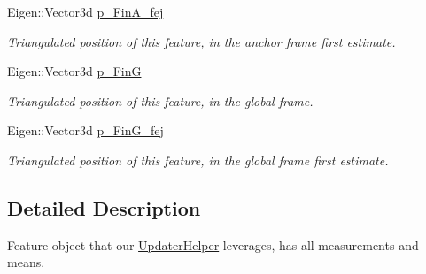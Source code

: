 \begin{DoxyCompactItemize}
\mbox{\label{structov__msckf_1_1UpdaterHelper_1_1UpdaterHelperFeature_a0558ee91d9c7e0929a10b5b4f4946f02}} 
Eigen\+::\+Vector3d \hyperlink{structov__msckf_1_1UpdaterHelper_1_1UpdaterHelperFeature_a0558ee91d9c7e0929a10b5b4f4946f02}{p\+\_\+\+Fin\+A\+\_\+fej}
\begin{DoxyCompactList}\small\item\em Triangulated position of this feature, in the anchor frame first estimate. \end{DoxyCompactList}\item 
\mbox{\label{structov__msckf_1_1UpdaterHelper_1_1UpdaterHelperFeature_a3969fdadac10a9873ce77468ed4b68b4}} 
Eigen\+::\+Vector3d \hyperlink{structov__msckf_1_1UpdaterHelper_1_1UpdaterHelperFeature_a3969fdadac10a9873ce77468ed4b68b4}{p\+\_\+\+FinG}
\begin{DoxyCompactList}\small\item\em Triangulated position of this feature, in the global frame. \end{DoxyCompactList}\item 
\mbox{\label{structov__msckf_1_1UpdaterHelper_1_1UpdaterHelperFeature_a683f5e77e259db6e9fe564c8f68b7733}} 
Eigen\+::\+Vector3d \hyperlink{structov__msckf_1_1UpdaterHelper_1_1UpdaterHelperFeature_a683f5e77e259db6e9fe564c8f68b7733}{p\+\_\+\+Fin\+G\+\_\+fej}
\begin{DoxyCompactList}\small\item\em Triangulated position of this feature, in the global frame first estimate. \end{DoxyCompactList}\end{DoxyCompactItemize}


\subsection{Detailed Description}
Feature object that our \hyperlink{classov__msckf_1_1UpdaterHelper}{Updater\+Helper} leverages, has all measurements and means. 